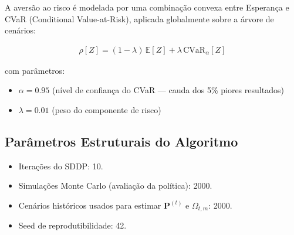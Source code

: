 \documentclass{article}
\begin{document}
A aversão ao risco é modelada por uma combinação convexa entre Esperança e CVaR
(Conditional Value-at-Risk), aplicada globalmente sobre a árvore de cenários:

\begin{align}
    \rho[Z] = (1 - \lambda)\, \mathbb{E}[Z] + \lambda\, \text{CVaR}_{\alpha}[Z]
\end{align}

com parâmetros:
\begin{itemize}
    \item $\alpha = 0.95$ (nível de confiança do CVaR — cauda dos 5\% piores resultados)
    \item $\lambda = 0.01$ (peso do componente de risco)
\end{itemize}

\subsection{Parâmetros Estruturais do Algoritmo}

\begin{itemize}
    \item Iterações do SDDP: 10.
    \item Simulações Monte Carlo (avaliação da política): 2000.
    \item Cenários históricos usados para estimar $\mathbf{P}^{(t)}$ e $\Omega_{t,m}$: 2000.
    \item Seed de reprodutibilidade: 42.
\end{itemize}
\end{document}
